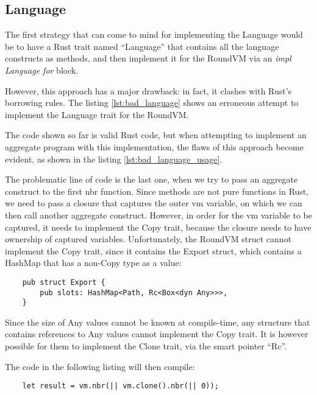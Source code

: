 \subsection{Language}
The first strategy that can come to mind for implementing the Language would be to have a Rust trait named ``Language'' that contains all the language constructs as methods, and then implement
it for the RoundVM via an \textit{impl Language for} block.

However, this approach has a major drawback: in fact, it clashes with Rust's borrowing rules.
The listing \ref{lst:bad_language} shows an erroneous attempt to implement the Language trait for the RoundVM.



The code shown so far is valid Rust code, but when attempting to implement an aggregate program with this implementation, the flaws of this approach become evident, as
shown in the listing \ref{lst:bad_language_usage}.



The problematic line of code is the last one, when we try to pass an aggregate construct to the first nbr function. Since methods are not pure functions in Rust,
we need to pass a closure that captures the outer vm variable, on which we can then call another aggregate construct. However, in order for the vm variable to be
captured, it needs to implement the Copy trait, because the closure needs to have ownership of captured variables. Unfortunately, the RoundVM struct cannot implement the
Copy trait, since it contains the Export struct, which contains a HashMap that has a non-Copy type as a value:

\begin{lstlisting}
    pub struct Export {
        pub slots: HashMap<Path, Rc<Box<dyn Any>>>,
    }
\end{lstlisting}

Since the size of Any values cannot be known at compile-time, any structure that contains references to Any values cannot implement the Copy trait.
It is however possible for them to implement the Clone trait, via the smart pointer ``Rc''.

The code in the following listing will then compile:

\begin{lstlisting}
    let result = vm.nbr(|| vm.clone().nbr(|| 0));
\end{lstlisting}

